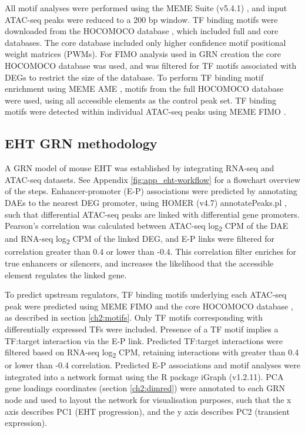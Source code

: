 All motif analyses were performed using the MEME Suite (v5.4.1) \citep{bailey_meme_2015}, and input ATAC-seq peaks were reduced to a 200 bp window. TF binding motifs were downloaded from the HOCOMOCO database \citep{kulakovskiy_hocomoco_2018}, which included full and core databases. The core database included only higher confidence motif positional weight matrices (PWMs). For FIMO analysis used in GRN creation the core HOCOMOCO database was used, and was filtered for TF motifs associated with DEGs to restrict the size of the database. To perform TF binding motif enrichment using MEME AME \citep{mcleay_motif_2010}, motifs from the full HOCOMOCO database were used, using all accessible elements as the control peak set. TF binding motifs were detected within individual ATAC-seq peaks using MEME FIMO \citep{grant_fimo_2011}. 

\subsection{\label{ch2:eht-grn}EHT GRN methodology}

A GRN model of mouse EHT was established by integrating RNA-seq and ATAC-seq datasets. See Appendix \ref{fig:app_eht-workflow} for a flowchart overview of the steps. Enhancer-promoter (E-P) associations were predicted by annotating DAEs to the nearest DEG promoter, using HOMER (v4.7) annotatePeaks.pl \citep{heinz_simple_2010}, such that differential ATAC-seq peaks are linked with differential gene promoters. Pearson's correlation was calculated between ATAC-seq log\textsubscript{2} CPM of the DAE and RNA-seq log\textsubscript{2} CPM of the linked DEG, and E-P links were filtered for correlation greater than 0.4 or lower than -0.4. This correlation filter enriches for true enhancers or silencers, and increases the likelihood that the accessible element regulates the linked gene.

To predict upstream regulators, TF binding motifs underlying each ATAC-seq peak were predicted using MEME FIMO \citep{grant_fimo_2011} and the core HOCOMOCO database \citep{kulakovskiy_hocomoco_2018}, as described in section \ref{ch2:motifs}. Only TF motifs corresponding with differentially expressed TFs were included. Presence of a TF motif implies a TF:target interaction via the E-P link. Predicted TF:target interactions were filtered based on RNA-seq log\textsubscript{2} CPM, retaining interactions with greater than 0.4 or lower than -0.4 correlation. Predicted E-P associations and motif analyses were integrated into a network format using the R package iGraph (v1.2.11). PCA gene loadings coordinates (section \ref{ch2:dimred}) were annotated to each GRN node and used to layout the network for visualisation purposes, such that the x axis describes PC1 (EHT progression), and the y axis describes PC2 (transient expression).

